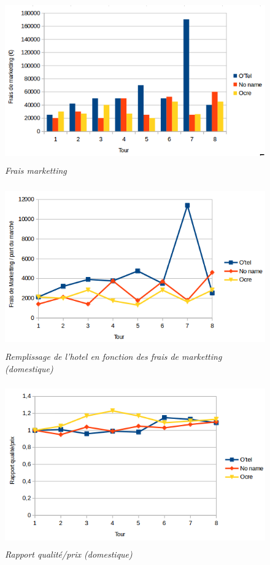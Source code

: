 \documentclass[a4paper,10pt]{article}
\begin{document}
    \begin{figure}[!ht]
      \begin{center}
	\includegraphics[height=7cm,keepaspectratio]{./images/frais_marketting.png}
      \end{center}
      \caption{\textit{Frais marketting}}
    \end{figure}
    
    \begin{figure}[!ht]
      \begin{center}
	\includegraphics[height=7cm,keepaspectratio]{./images/marketting_part_marche.png}
      \end{center}
      \caption{\textit{Remplissage de l'hotel en fonction des frais de marketting (domestique)}}
    \end{figure}
    
    \begin{figure}[!ht]
      \begin{center}
	\includegraphics[height=7cm,keepaspectratio]{./images/rapport_qualite_prix.png}
      \end{center}
      \caption{\textit{Rapport qualité/prix (domestique)}}
    \end{figure}
\end{document}
